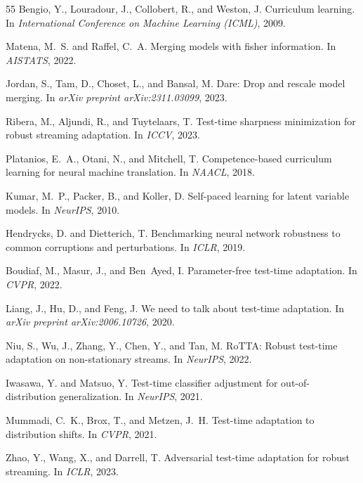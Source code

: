 \documentclass{article}
\theoremstyle{plain}
\theoremstyle{definition}
\theoremstyle{remark}
\begin{document}
\begin{thebibliography}{55}
Bengio, Y., Louradour, J., Collobert, R., and Weston, J.
\newblock Curriculum learning.
\newblock In \emph{International Conference on Machine Learning (ICML)}, 2009.

Matena, M.~S. and Raffel, C.~A.
\newblock Merging models with fisher information.
\newblock In \emph{AISTATS}, 2022.

Jordan, S., Tam, D., Choset, L., and Bansal, M.
\newblock Dare: Drop and rescale model merging.
\newblock In \emph{arXiv preprint arXiv:2311.03099}, 2023.

Ribera, M., Aljundi, R., and Tuytelaars, T.
\newblock Test-time sharpness minimization for robust streaming adaptation.
\newblock In \emph{ICCV}, 2023.

Platanios, E.~A., Otani, N., and Mitchell, T.
\newblock Competence-based curriculum learning for neural machine translation.
\newblock In \emph{NAACL}, 2018.

Kumar, M.~P., Packer, B., and Koller, D.
\newblock Self-paced learning for latent variable models.
\newblock In \emph{NeurIPS}, 2010.

Hendrycks, D. and Dietterich, T.
\newblock Benchmarking neural network robustness to common corruptions and perturbations.
\newblock In \emph{ICLR}, 2019.

Boudiaf, M., Masur, J., and Ben~Ayed, I.
\newblock Parameter-free test-time adaptation.
\newblock In \emph{CVPR}, 2022.

Liang, J., Hu, D., and Feng, J.
\newblock We need to talk about test-time adaptation.
\newblock In \emph{arXiv preprint arXiv:2006.10726}, 2020.

Niu, S., Wu, J., Zhang, Y., Chen, Y., and Tan, M.
\newblock RoTTA: Robust test-time adaptation on non-stationary streams.
\newblock In \emph{NeurIPS}, 2022.

Iwasawa, Y. and Matsuo, Y.
\newblock Test-time classifier adjustment for out-of-distribution generalization.
\newblock In \emph{NeurIPS}, 2021.

Mummadi, C.~K., Brox, T., and Metzen, J.~H.
\newblock Test-time adaptation to distribution shifts.
\newblock In \emph{CVPR}, 2021.

Zhao, Y., Wang, X., and Darrell, T.
\newblock Adversarial test-time adaptation for robust streaming.
\newblock In \emph{ICLR}, 2023.


\end{thebibliography}
\end{document}
